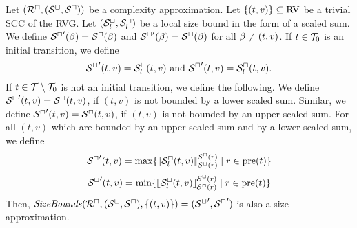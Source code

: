 \begin{theorem}
  Let $({\mathcal{R}^\sqcap}, {({\mathcal{S}^\sqcup}, {\mathcal{S}^\sqcap})})$ be a complexity approximation.
  Let $\lbrace (t,v) \rbrace \subseteq \text{RV}$ be a trivial SCC of the RVG.
  Let ${({\mathcal{S}^\sqcup_l}, {\mathcal{S}^\sqcap_l})}$ be a local size bound in the form of a scaled sum.
  We define ${\mathcal{S}^\sqcap}'(\beta) = {\mathcal{S}^\sqcap}(\beta)$ and ${\mathcal{S}^\sqcup}'(\beta) = {\mathcal{S}^\sqcup}(\beta)$ for all $\beta \neq (t,v)$.
  If $t \in \mathcal{T}_0$ is an initial transition, we define
  \[ {\mathcal{S}^\sqcup}'(t, v) = {\mathcal{S}^\sqcup_l}(t, v) \text{ and } {\mathcal{S}^\sqcap}'(t, v) = {\mathcal{S}^\sqcap_l}(t, v). \]
  If $t \in \mathcal{T} \setminus \mathcal{T}_0$ is not an initial transition, we define the following.
  We define ${\mathcal{S}^\sqcup}'(t,v) = {\mathcal{S}^\sqcup}(t,v)$, if $(t,v)$ is not bounded by a lower scaled sum.
  Similar, we define ${\mathcal{S}^\sqcap}'(t,v) = {\mathcal{S}^\sqcap}(t,v)$, if $(t,v)$ is not bounded by an upper scaled sum.
  For all $(t,v)$ which are bounded by an upper scaled sum and by a lower scaled sum, we define 
  \[ {\mathcal{S}^\sqcap}'(t,v) = \max \lbrace  \llbracket {\mathcal{S}^\sqcap_l}(t,v) \rrbracket_{{\mathcal{S}^\sqcup}(r)}^{{\mathcal{S}^\sqcap}(r)} \mid r \in \text{pre}(t) \rbrace \]
  \[ {\mathcal{S}^\sqcup}'(t,v) = \min \lbrace  \llbracket {\mathcal{S}^\sqcup_l}(t,v) \rrbracket_{{\mathcal{S}^\sqcap}(r)}^{{\mathcal{S}^\sqcup}(r)} \mid r \in \text{pre}(t) \rbrace \]
  Then, $\mathit{SizeBounds}({\mathcal{R}^\sqcap}, {({\mathcal{S}^\sqcup}, {\mathcal{S}^\sqcap})}, \lbrace (t,v) \rbrace) = ({\mathcal{S}^\sqcup}', {\mathcal{S}^\sqcap}')$ is also a size approximation.
\end{theorem}
